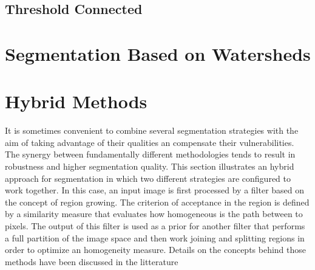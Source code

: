 \subsection{Threshold Connected}

\section{Segmentation Based on Watersheds}
\label{sec:WatershedSegmentation}






\section{Hybrid Methods} 
\label{sec:HybridSegmentationMethods}

It is sometimes convenient to combine several segmentation strategies with the
aim of taking advantage of their qualities an compensate their vulnerabilities.
The synergy between fundamentally different methodologies tends to result in
robustness and higher segmentation quality.  This section illustrates an hybrid
approach for segmentation in which two different strategies are configured to
work together. In this case, an input image is first processed by a filter
based on the concept of region growing. The criterion of acceptance in the
region is defined by a similarity measure that evaluates how homogeneous is the
path between to pixels. The output of this filter is used as a prior for
another filter that performs a full partition of the image space and then work
joining and splitting regions in order to optimize an homogeneity measure.
Details on the concepts behind those methods have been discussed in the
litterature
\cite{Angelini2002,Udupa2002,Jin2002,Imielinska2001,Imielinska2000a,Imielinska2000b}





